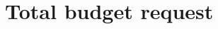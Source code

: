 \documentclass[fontsize=10pt,paper=letter,twoside=false,onecolumn,headings=small]{scrartcl} %
\begin{document}




\section*{Total budget request}
\end{document}
